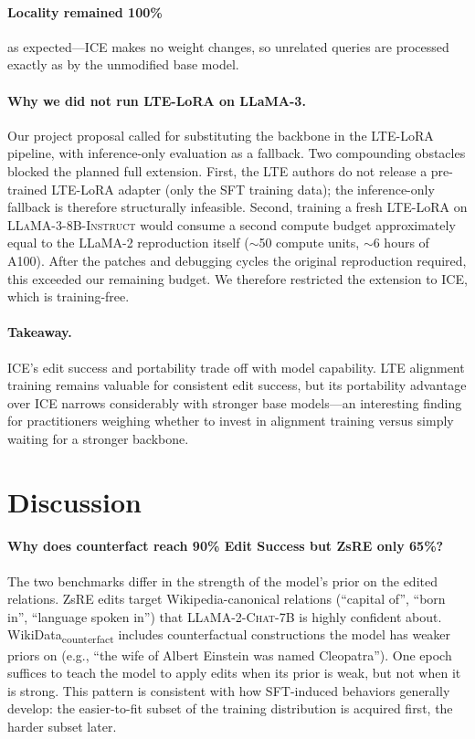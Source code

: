 \documentclass[11pt,a4paper,twocolumn]{article}
\begin{document}
\paragraph{Locality remained 100\%} as expected---ICE makes no weight changes, so unrelated queries are processed exactly as by the unmodified base model.

\paragraph{Why we did not run LTE-LoRA on LLaMA-3.} Our project proposal called for substituting the backbone in the LTE-LoRA pipeline, with inference-only evaluation as a fallback. Two compounding obstacles blocked the planned full extension. First, the LTE authors do not release a pre-trained LTE-LoRA adapter (only the SFT training data); the inference-only fallback is therefore structurally infeasible. Second, training a fresh LTE-LoRA on \textsc{LLaMA-3-8B-Instruct} would consume a second compute budget approximately equal to the LLaMA-2 reproduction itself ($\sim$50 compute units, $\sim$6 hours of A100). After the patches and debugging cycles the original reproduction required, this exceeded our remaining budget. We therefore restricted the extension to ICE, which is training-free.

\paragraph{Takeaway.} ICE's edit success and portability trade off with model capability. LTE alignment training remains valuable for consistent edit success, but its portability advantage over ICE narrows considerably with stronger base models---an interesting finding for practitioners weighing whether to invest in alignment training versus simply waiting for a stronger backbone.

\section{Discussion}
\label{sec:discussion}

\paragraph{Why does counterfact reach 90\% Edit Success but ZsRE only 65\%?} The two benchmarks differ in the strength of the model's prior on the edited relations. ZsRE edits target Wikipedia-canonical relations (``capital of'', ``born in'', ``language spoken in'') that \textsc{LLaMA-2-Chat-7B} is highly confident about. WikiData\textsubscript{counterfact} includes counterfactual constructions the model has weaker priors on (e.g., ``the wife of Albert Einstein was named Cleopatra''). One epoch suffices to teach the model to apply edits when its prior is weak, but not when it is strong. This pattern is consistent with how SFT-induced behaviors generally develop: the easier-to-fit subset of the training distribution is acquired first, the harder subset later.
\end{document}
